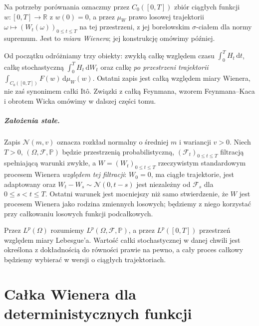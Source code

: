 \documentclass[11pt,a4paper,oneside]{report}
\numberwithin{equation}{chapter}
\theoremstyle{plain}
\theoremstyle{definition}
\theoremstyle{remark}
\newcommand{\R}{\mathbb{R}}
\newcommand{\Prob}{\mathbb{P}}
\newcommand{\calF}{\mathcal{F}}
\newcommand{\dd}{\mathrm{d}}
\newcommand{\Normal}{\mathcal{N}}
\begin{document}
Na potrzeby porównania oznaczmy przez $C_0([0,T])$
zbiór ciągłych funkcji $w:[0,T]\to\R$ z $w(0)=0$,
a przez $\mu_W$ prawo losowej trajektorii
$\omega\mapsto (W_t(\omega))_{0\le t\le T}$ na tej przestrzeni,
z jej borelowskim $\sigma$-ciałem dla normy supremum.
Jest to \emph{miara Wienera}; jej konstrukcję omówimy później.

Od początku odróżniamy trzy obiekty: zwykłą całkę względem czasu
$\int_0^T H_t\,\dd t$, całkę stochastyczną
$\int_0^T H_t\,\dd W_t$ oraz całkę \emph{po przestrzeni trajektorii}
$\int_{C_0([0,T])} F(w)\,\dd\mu_W(w)$. Ostatni zapis jest całką względem miary
Wienera, nie zaś synonimem całki Itô. Związki z całką Feynmana,
wzorem Feynmana--Kaca i obrotem Wicka omówimy w dalszej części tomu.

\paragraph{Założenia stałe.}
Zapis $\Normal(m,v)$ oznacza rozkład normalny o średniej $m$
i wariancji $v>0$.
Niech $T>0$, $(\Omega,\calF,\Prob)$ będzie przestrzenią probabilistyczną,
$(\calF_t)_{0\le t\le T}$ filtracją spełniającą warunki zwykłe,
a $W=(W_t)_{0\le t\le T}$ rzeczywistym standardowym procesem Wienera
\emph{względem tej filtracji}: $W_0=0$, ma ciągłe trajektorie,
jest adaptowany oraz $W_t-W_s\sim\Normal(0,t-s)$ jest niezależny
od $\calF_s$ dla $0\le s<t\le T$. Ostatni warunek jest mocniejszy
niż samo stwierdzenie, że $W$ jest procesem Wienera jako rodzina
zmiennych losowych; będziemy z niego korzystać przy całkowaniu
losowych funkcji podcałkowych.

Przez $L^p(\Omega)$ rozumiemy $L^p(\Omega,\calF,\Prob)$,
a przez $L^p([0,T])$ przestrzeń względem miary Lebesgue'a.
Wartość całki stochastycznej w danej chwili jest określona z dokładnością
do równości prawie na pewno, a cały proces całkowy będziemy wybierać
w wersji o ciągłych trajektoriach.


\par\smallskip{}\par\smallskip
\chapter{Całka Wienera dla deterministycznych funkcji}
\label{chap:volIII:01}
\par\smallskip{}\par\smallskip
\end{document}
